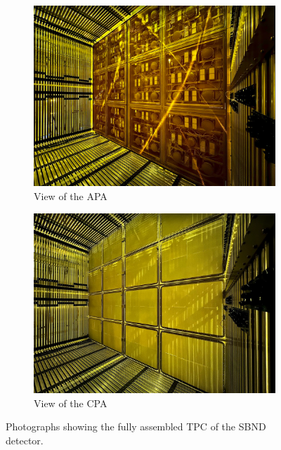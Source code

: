 \begin{figure}[htbp!]
\begin{subfigure}[h]{0.5\linewidth}
\centering    
\includegraphics[width=\linewidth]{SBND_APA_PDS}
\caption{View of the APA}
\label{fig:SBND_APA}
\end{subfigure}%
\hfill
\begin{subfigure}[h]{0.5\linewidth}
\centering    
\includegraphics[width=\linewidth]{SBND_CPA}
\caption{View of the CPA}
\label{fig:SBND_CPA}
\end{subfigure}
\caption[Time Projection Chamber Photographs]{
Photographs showing the fully assembled TPC of the SBND detector. 
}
\label{fig:SBND_CPA_APA}
\end{figure}

